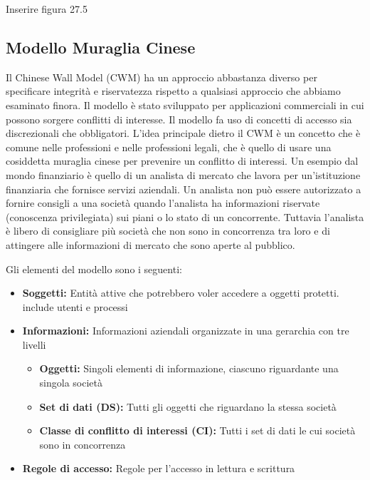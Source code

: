 Inserire figura 27.5

\newpage
\subsection{Modello Muraglia Cinese}
Il Chinese Wall Model (CWM) ha un approccio abbastanza diverso per specificare integrità e riservatezza rispetto a qualsiasi approccio che abbiamo esaminato finora. Il modello è stato sviluppato per applicazioni commerciali in cui possono sorgere conflitti di interesse. Il modello fa uso di concetti di accesso sia discrezionali che obbligatori. L'idea principale dietro il CWM è un concetto che è comune nelle professioni e nelle professioni legali, che è quello di usare una cosiddetta muraglia cinese per prevenire un conflitto di interessi. Un esempio dal mondo finanziario è quello di un analista di mercato che lavora per un'istituzione finanziaria che fornisce servizi aziendali. Un analista non può essere autorizzato a fornire consigli a una società quando l'analista ha informazioni riservate (conoscenza privilegiata) sui piani o lo stato di un concorrente. Tuttavia l'analista è libero di consigliare più società che non sono in concorrenza tra loro e di attingere alle informazioni di mercato che sono aperte al pubblico. 

\singlespacing

Gli elementi del modello sono i seguenti:

\begin{itemize}
    \item \textbf{Soggetti:} Entità attive che potrebbero voler accedere a oggetti protetti. include utenti e processi

    \item \textbf{Informazioni:} Informazioni aziendali organizzate in una gerarchia con tre livelli
    
    \begin{itemize}
        \item \textbf{Oggetti:} Singoli elementi di informazione, ciascuno riguardante una singola società
        
        \item \textbf{Set di dati (DS):} Tutti gli oggetti che riguardano la stessa società
        
        \item \textbf{Classe di conflitto di interessi (CI):} Tutti i set di dati le cui società sono in concorrenza

    \end{itemize}
    \item \textbf{Regole di accesso:} Regole per l'accesso in lettura e scrittura
\end{itemize}

